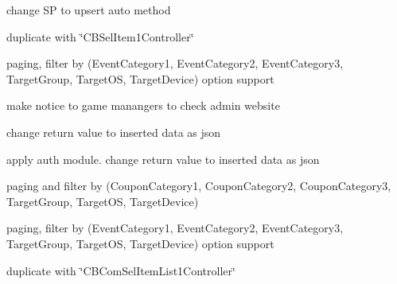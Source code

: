 
\begin{DoxyRefList}
\item[\label{todo__todo000001}%
\hypertarget{todo__todo000001}{}%
File \hyperlink{_c_b_add_member_item_purchase_controller_8cs}{C\+B\+Add\+Member\+Item\+Purchase\+Controller.cs} ]change SP to upsert auto method  
\item[\label{todo__todo000002}%
\hypertarget{todo__todo000002}{}%
File \hyperlink{_c_b_com_sel_item_list1_controller_8cs}{C\+B\+Com\+Sel\+Item\+List1\+Controller.cs} ]duplicate with \char`\"{}\+C\+B\+Sel\+Item1\+Controller\char`\"{}  
\item[\label{todo__todo000003}%
\hypertarget{todo__todo000003}{}%
File \hyperlink{_c_b_com_sel_member_game_infoes_controller_8cs}{C\+B\+Com\+Sel\+Member\+Game\+Infoes\+Controller.cs} ]paging, filter by (Event\+Category1, Event\+Category2, Event\+Category3, Target\+Group, Target\+OS, Target\+Device) option support  
\item[\label{todo__todo000004}%
\hypertarget{todo__todo000004}{}%
File \hyperlink{_c_b_com_udt_member_item_purchase_controller_8cs}{C\+B\+Com\+Udt\+Member\+Item\+Purchase\+Controller.cs} ]make notice to game manangers to check admin website  
\item[\label{todo__todo000005}%
\hypertarget{todo__todo000005}{}%
File \hyperlink{_c_b_ins_anonymous_reg_member_controller_8cs}{C\+B\+Ins\+Anonymous\+Reg\+Member\+Controller.cs} ]change return value to inserted data as json  
\item[\label{todo__todo000006}%
\hypertarget{todo__todo000006}{}%
File \hyperlink{_c_b_ins_reg_member_controller_8cs}{C\+B\+Ins\+Reg\+Member\+Controller.cs} ]apply auth module. change return value to inserted data as json  
\item[\label{todo__todo000007}%
\hypertarget{todo__todo000007}{}%
File \hyperlink{_c_b_sel_coupons_controller_8cs}{C\+B\+Sel\+Coupons\+Controller.cs} ]paging and filter by (Coupon\+Category1, Coupon\+Category2, Coupon\+Category3, Target\+Group, Target\+OS, Target\+Device)  
\item[\label{todo__todo000008}%
\hypertarget{todo__todo000008}{}%
File \hyperlink{_c_b_sel_game_events_controller_8cs}{C\+B\+Sel\+Game\+Events\+Controller.cs} ]paging, filter by (Event\+Category1, Event\+Category2, Event\+Category3, Target\+Group, Target\+OS, Target\+Device) option support  
\item[\label{todo__todo000009}%
\hypertarget{todo__todo000009}{}%
File \hyperlink{_c_b_sel_item1_controller_8cs}{C\+B\+Sel\+Item1\+Controller.cs} ]duplicate with \char`\"{}\+C\+B\+Com\+Sel\+Item\+List1\+Controller\char`\"{}  

\end{DoxyRefList}
